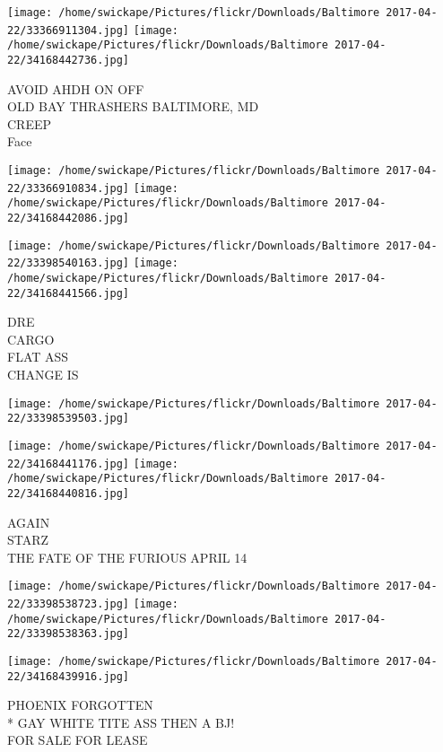 \documentclass[10pt,letterpaper]{article}
\begin{document}
\texttt{[image: /home/swickape/Pictures/flickr/Downloads/Baltimore 2017-04-22/33366911304.jpg]}
\texttt{[image: /home/swickape/Pictures/flickr/Downloads/Baltimore 2017-04-22/34168442736.jpg]}

AVOID AHDH ON OFF\\
OLD BAY THRASHERS BALTIMORE, MD\\
CREEP\\
Face\\
\pagebreak

\texttt{[image: /home/swickape/Pictures/flickr/Downloads/Baltimore 2017-04-22/33366910834.jpg]}
\texttt{[image: /home/swickape/Pictures/flickr/Downloads/Baltimore 2017-04-22/34168442086.jpg]}

\texttt{[image: /home/swickape/Pictures/flickr/Downloads/Baltimore 2017-04-22/33398540163.jpg]}
\texttt{[image: /home/swickape/Pictures/flickr/Downloads/Baltimore 2017-04-22/34168441566.jpg]}

DRE\\
CARGO\\
FLAT ASS\\
CHANGE IS\\
\pagebreak

\texttt{[image: /home/swickape/Pictures/flickr/Downloads/Baltimore 2017-04-22/33398539503.jpg]}

\vspace{0.25in}
\texttt{[image: /home/swickape/Pictures/flickr/Downloads/Baltimore 2017-04-22/34168441176.jpg]}
\texttt{[image: /home/swickape/Pictures/flickr/Downloads/Baltimore 2017-04-22/34168440816.jpg]}

AGAIN\\
STARZ\\
THE FATE OF THE FURIOUS APRIL 14\\
\pagebreak

\texttt{[image: /home/swickape/Pictures/flickr/Downloads/Baltimore 2017-04-22/33398538723.jpg]}
\texttt{[image: /home/swickape/Pictures/flickr/Downloads/Baltimore 2017-04-22/33398538363.jpg]}

\texttt{[image: /home/swickape/Pictures/flickr/Downloads/Baltimore 2017-04-22/34168439916.jpg]}

PHOENIX FORGOTTEN\\
* GAY WHITE TITE ASS THEN A BJ!\\
FOR SALE FOR LEASE\\
\pagebreak
\end{document}
